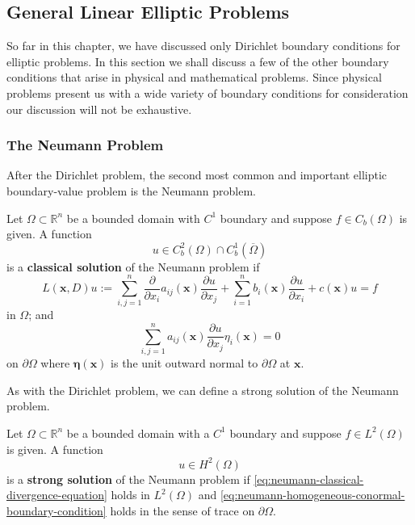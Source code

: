 \subsection{General Linear Elliptic Problems}\label{sec:general-linear-elliptic-problems}

So far in this chapter, we have discussed only Dirichlet boundary conditions for elliptic problems. In this section we shall discuss a few of the other boundary conditions that arise in physical and mathematical problems. Since physical problems present us with a wide variety of boundary conditions for consideration our discussion will not be exhaustive.

\subsubsection{The Neumann Problem}\label{subsec:neumann-problem}

After the Dirichlet problem, the second most common and important elliptic boundary-value problem is the Neumann problem.

\begin{Definition}
\label{def:classical-neumann-solution}
Let $\Omega\subset\mathbb{R}^n$ be a bounded domain with $C^1$ boundary and suppose $f\in C_b(\Omega)$ is given. A function\[u\in C_b^2(\Omega)\cap C_b^1(\overline\Omega)\]is a \textbf{classical solution} of the Neumann problem if
\begin{equation}\label{eq:neumann-classical-divergence-equation}
L(\bm{x},D)u:=\sum_{i,j=1}^n\frac{\partial}{\partial x_i}a_{ij}(\bm{x})\frac{\partial u}{\partial x_j}+\sum_{i=1}^nb_i(\bm{x})\frac{\partial u}{\partial x_i}+c(\bm{x})u=f
\end{equation}
in $\Omega$; and
\begin{equation}\label{eq:neumann-homogeneous-conormal-boundary-condition}
\sum_{i,j=1}^na_{ij}(\bm{x})\frac{\partial u}{\partial x_j}\eta_i(\bm{x})=0
\end{equation}
on $\partial\Omega$ where $\bm{\eta}(\bm{x})$ is the unit outward normal to $\partial\Omega$ at $\bm{x}$.
\end{Definition}

As with the Dirichlet problem, we can define a strong solution of the Neumann problem.

\begin{Definition}
\label{def:strong-neumann-solution}
Let $\Omega\subset\mathbb{R}^n$ be a bounded domain with a $C^1$ boundary and suppose $f\in L^2(\Omega)$ is given. A function\[u\in H^2(\Omega)\]is a \textbf{strong solution} of the Neumann problem if \eqref{eq:neumann-classical-divergence-equation} holds in $L^2(\Omega)$ and \eqref{eq:neumann-homogeneous-conormal-boundary-condition} holds in the sense of trace on $\partial\Omega$.
\end{Definition}


